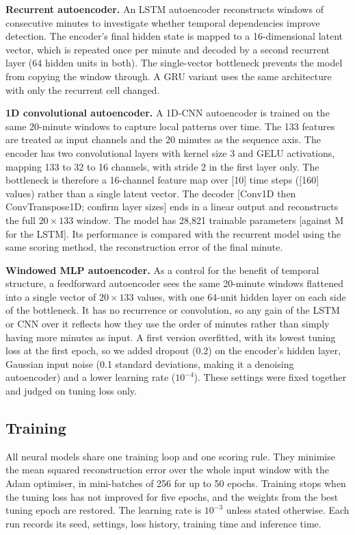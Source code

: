 \documentclass[conference]{IEEEtran}
\begin{document}
\textbf{Recurrent autoencoder.} An LSTM autoencoder reconstructs windows of consecutive minutes to investigate whether temporal dependencies improve detection. The encoder's final hidden state is mapped to a 16-dimensional latent vector, which is repeated once per minute and decoded by a second recurrent layer (64 hidden units in both). The single-vector bottleneck prevents the model from copying the window through. A GRU variant uses the same architecture with only the recurrent cell changed.

\textbf{1D convolutional autoencoder.} A 1D-CNN autoencoder is trained
on the same 20-minute windows to capture local patterns over time. The
133 features are treated as input channels and the 20 minutes as the
sequence axis. The encoder has two convolutional layers with kernel
size 3 and GELU activations, mapping 133 to 32 to 16 channels, with
stride 2 in the first layer only. The bottleneck is therefore a
16-channel feature map over [10] time steps ([160] values) rather than a
single latent vector. The decoder [Conv1D then ConvTranspose1D; confirm
layer sizes] ends in a linear output and reconstructs the full
$20 \times 133$ window. The model has 28,821 trainable parameters
[against M for the LSTM]. Its performance is compared with the recurrent
model using the same scoring method, the reconstruction error of the
final minute.


\textbf{Windowed MLP autoencoder.} As a control for the benefit of temporal structure, a feedforward autoencoder sees the same 20-minute windows flattened into a single vector of $20 \times 133$ values, with one 64-unit hidden layer on each side of the bottleneck. It has no recurrence or convolution, so any gain of the LSTM or CNN over it reflects how they use the order of minutes rather than simply having more minutes as input. A first version overfitted, with its lowest tuning loss at the first epoch, so we added dropout (0.2) on the encoder's hidden layer, Gaussian input noise (0.1 standard deviations, making it a denoising autoencoder) and a lower learning rate ($10^{-4}$). These settings were fixed together and judged on tuning loss only.

\subsection{Training}
All neural models share one training loop and one scoring rule. They minimise the mean squared reconstruction error over the whole input window with the Adam optimiser, in mini-batches of 256 for up to 50 epochs. Training stops when the tuning loss has not improved for five epochs, and the weights from the best tuning epoch are restored. The learning rate is $10^{-3}$ unless stated otherwise. Each run records its seed, settings, loss history, training time and inference time.
\end{document}
